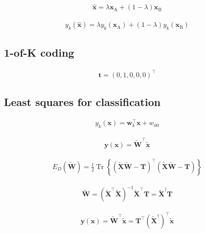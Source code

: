 \documentclass{article}
\begin{document}
\begin{align*}
\widehat{\mathbf{x}} = \lambda \mathbf{x}_{\mathrm{A}} + (1-\lambda) \mathbf{x}_{\mathrm{B}}
\tag{5.9}
\end{align*}

\begin{align*}
y_k(\widehat{\mathbf{x}}) = \lambda y_k(\mathbf{x}_{\mathrm{A}}) + (1-\lambda) y_k(\mathbf{x}_{\mathrm{B}})
\tag{5.10}
\end{align*}

\subsection{1-of-K coding}

\begin{align*}
\mathbf{t} = (0, 1, 0, 0, 0)^{\top}
\tag{5.11}
\end{align*}

\subsection{Least squares for classification}

\begin{align*}
y_k(\mathbf{x}) = \mathbf{w}_k^{\top} \mathbf{x} + w_{k0}
\tag{5.12}
\end{align*}

\begin{align*}
\mathbf{y}(\mathbf{x}) = \widetilde{\mathbf{W}}^{\top} \widetilde{\mathbf{x}}
\tag{5.13}
\end{align*}

\begin{align*}
E_D(\widetilde{\mathbf{W}}) = \frac{1}{2} \operatorname{Tr}\left\{ (\widetilde{\mathbf{X}} \widetilde{\mathbf{W}} - \mathbf{T})^{\top} (\widetilde{\mathbf{X}} \widetilde{\mathbf{W}} - \mathbf{T}) \right\}
\tag{5.14}
\end{align*}

\begin{align*}
\widetilde{\mathbf{W}} = \left( \widetilde{\mathbf{X}}^{\top} \widetilde{\mathbf{X}} \right)^{-1} \widetilde{\mathbf{X}}^{\top} \mathbf{T} = \widetilde{\mathbf{X}}^{\dagger} \mathbf{T}
\tag{5.15}
\end{align*}

\begin{align*}
\mathbf{y}(\mathbf{x}) = \widetilde{\mathbf{W}}^{\top} \widetilde{\mathbf{x}} = \mathbf{T}^{\top} \left( \widetilde{\mathbf{X}}^{\dagger} \right)^{\top} \widetilde{\mathbf{x}}
\tag{5.16}
\end{align*}
\end{document}
